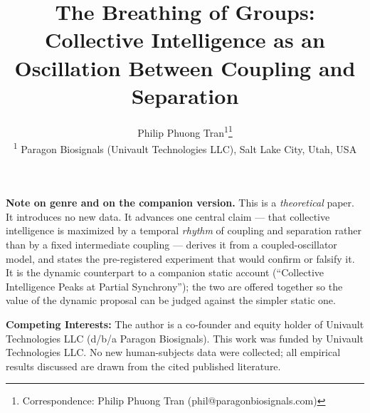 \documentclass[11pt]{article}
\title{The Breathing of Groups:\\
Collective Intelligence as an Oscillation Between Coupling and Separation}
\author{
  Philip Phuong Tran\textsuperscript{1}\thanks{Correspondence: Philip Phuong Tran (phil@paragonbiosignals.com)} \\[0.5em]
  \textsuperscript{1} Paragon Biosignals (Univault Technologies LLC), Salt Lake City, Utah, USA
}
\date{}
\begin{document}
\maketitle

\vspace{-1em}

\noindent\textbf{Note on genre and on the companion version.} This is a \emph{theoretical} paper. It introduces no new data. It advances one central claim --- that collective intelligence is maximized by a temporal \emph{rhythm} of coupling and separation rather than by a fixed intermediate coupling --- derives it from a coupled-oscillator model, and states the pre-registered experiment that would confirm or falsify it. It is the dynamic counterpart to a companion static account (``Collective Intelligence Peaks at Partial Synchrony''); the two are offered together so the value of the dynamic proposal can be judged against the simpler static one.

\medskip

\noindent\textbf{Competing Interests:} The author is a co-founder and equity holder of Univault Technologies LLC (d/b/a Paragon Biosignals). This work was funded by Univault Technologies LLC. No new human-subjects data were collected; all empirical results discussed are drawn from the cited published literature.

\bigskip
\end{document}
